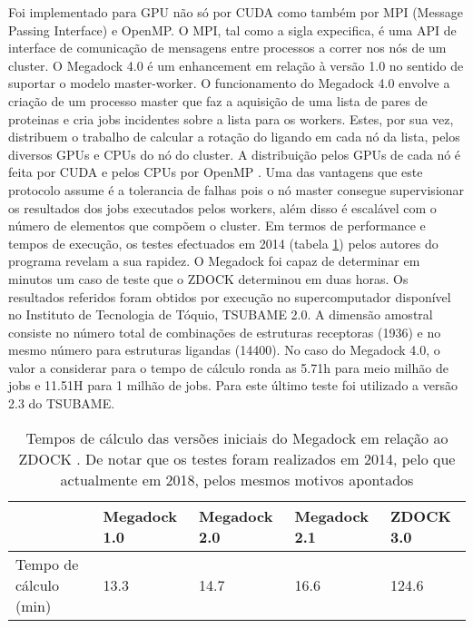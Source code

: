 Foi implementado para GPU não só por CUDA como também por MPI (Message Passing Interface) e OpenMP. 
 O MPI, tal como a sigla expecifica, é uma API de interface de comunicação de mensagens entre processos a correr nos nós de um cluster\cite{mpiBook}. %
 O Megadock 4.0 é um enhancement em relação à versão 1.0 no sentido de suportar o modelo master-worker. 
O funcionamento do Megadock 4.0 envolve a criação de um processo master que faz a aquisição de uma lista de pares de proteinas e cria jobs incidentes sobre a lista para os workers.
 Estes, por sua vez, distribuem o trabalho de calcular a rotação do ligando em cada nó da lista, pelos diversos GPUs e CPUs do nó do cluster. A distribuição pelos GPUs de cada nó é feita por CUDA e pelos CPUs por OpenMP \cite{megadock40}. 
 Uma das vantagens que este protocolo assume é a tolerancia de falhas pois o nó master consegue supervisionar os resultados dos jobs executados pelos workers, além disso é escalável com o número de elementos que compõem o cluster.
 Em termos de performance e tempos de execução, os testes efectuados em 2014 (tabela \ref{tab1}) pelos autores do programa revelam a sua rapidez. O Megadock foi capaz de determinar em minutos um caso de teste que o ZDOCK determinou em duas horas.
 Os resultados referidos foram obtidos por execução no supercomputador disponível no Instituto de Tecnologia de Tóquio, TSUBAME 2.0. A dimensão amostral consiste no número total de combinações de estruturas receptoras (1936) e no mesmo número para estruturas ligandas (14400). No caso do Megadock 4.0, o valor a considerar para o tempo de cálculo ronda as 5.71h para meio milhão de jobs e 11.51H para 1 milhão de jobs. Para este último teste foi utilizado a versão 2.3 do TSUBAME\cite{megadock40}. 
 
  
\begin{table}[]
\centering
\begin{tabular}{l|l|l|l|l|}
\cline{2-5}
                                             & Megadock 1.0 & Megadock 2.0 & Megadock 2.1 & ZDOCK 3.0 \\ \hline
\multicolumn{1}{|l|}{Tempo de cálculo (min)} & 13.3         & 14.7         & 16.6         & 124.6     \\ \hline
\end{tabular}
\caption{Tempos de cálculo das versões iniciais do Megadock em relação ao ZDOCK \cite{megadock}. De notar que os testes foram realizados em 2014, pelo que actualmente em 2018, pelos mesmos motivos apontados }
\label{tab1}
\end{table}

